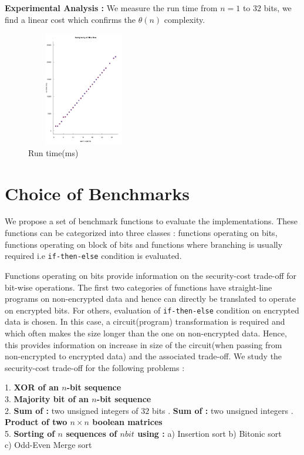 \documentclass{acm_proc_article-sp}
\begin{document}
\textbf{Experimental Analysis :} We measure the run time from $n=1$ to $32$ bits, we find a linear cost which confirms the $\theta(n)$ complexity.

\begin{figure}[!h] %
\centering
\includegraphics[width=5cm,height=5cm]{f2.pdf} 
\caption{Run time(ms)} 
\label{image_f2} %
\end{figure}

\section{Choice of Benchmarks}
\label{sec:bm}

We propose a set of benchmark functions to evaluate the implementations. These functions can be categorized into three classes : functions operating on bits, functions operating on block of bits and functions where branching is usually required i.e \texttt{if-then-else} condition is evaluated.

Functions operating on bits provide information on the security-cost trade-off for bit-wise operations. The first two categories of functions have straight-line programs on non-encrypted data and hence can directly be translated to operate on encrypted bits. For others, evaluation of \texttt{if-then-else} condition on encrypted data is chosen. In this case, a circuit(program) transformation is required and which often makes the size longer than the one on non-encrypted data. Hence, this provides information on increase in size of the circuit(when passing from non-encrypted to encrypted data) and the associated trade-off. We study the security-cost trade-off for the following problems : 

1. \textbf{XOR of an $n$-bit sequence}\\
3. \textbf{Majority bit of an $n$-bit sequence} \\
2. \textbf{Sum of :}  two unsigned integers of $32$ bits  . \textbf{Sum of :}  two unsigned integers  . \textbf{Product of two $n\times n$ boolean matrices} \\
5. \textbf{Sorting of $n$ sequences of $nbit$ using :} \newline\noindent
\phantom{x}\hspace{3ex} a) Insertion sort \phantom{x}\hspace{2ex} b) Bitonic sort \\
	\phantom{x}\hspace{3ex} 	     c) Odd-Even Merge sort 
\end{document}

